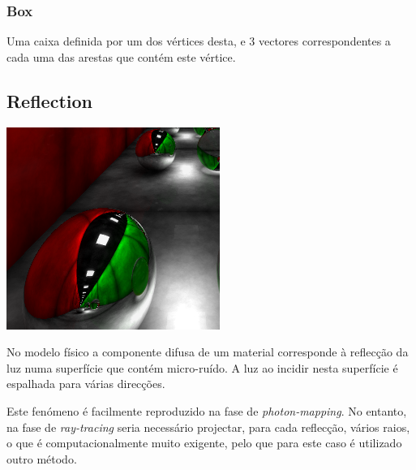 \documentclass[a4paper]{article}
\begin{document}
\subsubsection{Box}
\indent \indent Uma caixa definida por um dos vértices desta, e 3 vectores correspondentes a cada uma das 
arestas que contém este vértice.

\cleardoublepage
\subsection{Reflection}
\label{sec:reflection}

\begin{center}
	\includegraphics[scale=0.50]{images/reflection.png}
	\label{fig:reflection}
\end{center}

\indent No modelo físico a componente difusa de um material corresponde à reflecção da luz numa superfície
que contém micro-ruído. A luz ao incidir nesta superfície é espalhada para várias direcções. 

\indent Este fenómeno é facilmente reproduzido na fase de \emph{photon-mapping}.
No entanto, na fase de \emph{ray-tracing} seria necessário projectar, para cada reflecção, vários raios, o que
é computacionalmente muito exigente, pelo que para este caso é utilizado outro método.
\end{document}
